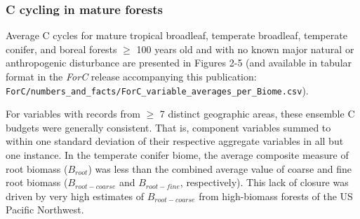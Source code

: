 \documentclass[
]{article}
\begin{document}
\hypertarget{c-cycling-in-mature-forests}{%
\subsubsection{C cycling in mature
forests}\label{c-cycling-in-mature-forests}}

Average C cycles for mature tropical broadleaf, temperate broadleaf,
temperate conifer, and boreal forests \(\ge\) 100 years old and with no
known major natural or anthropogenic disturbance are presented in
Figures 2-5 (and available in tabular format in the \emph{ForC} release
accompanying this publication:
\texttt{ForC/numbers\_and\_facts/ForC\_variable\_averages\_per\_Biome.csv}).

For variables with records from \(\ge\) 7 distinct geographic areas,
these ensemble C budgets were generally consistent. That is, component
variables summed to within one standard deviation of their respective
aggregate variables in all but one instance. In the temperate conifer
biome, the average composite measure of root biomass (\(B_{root}\)) was
less than the combined average value of coarse and fine root biomass
(\(B_{root-coarse}\) and \(B_{root-fine}\), respectively). This lack of
closure was driven by very high estimates of \(B_{root-coarse}\) from
high-biomass forests of the US Pacific Northwest.
\end{document}
